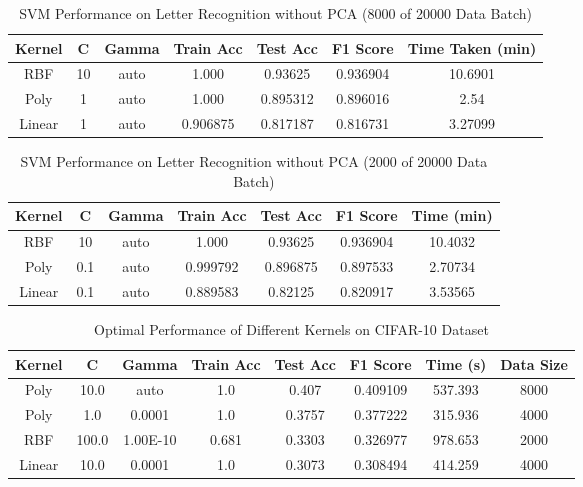 \documentclass[conference]{IEEEtran}
\begin{document}
\begin{table}[H]
\centering
\caption{SVM Performance on Letter Recognition without PCA (8000 of 20000 Data Batch)}
\begin{tabular}{|c|c|c|c|c|c|c|}
\hline
Kernel & C & Gamma & Train Acc & Test Acc & F1 Score & Time Taken (min) \\ \hline
RBF & 10 & auto & 1.000 & 0.93625 & 0.936904 & 10.6901 \\ \hline
Poly & 1 & auto & 1.000 & 0.895312 & 0.896016 & 2.54 \\ \hline
Linear & 1 & auto & 0.906875	 & 0.817187 & 0.816731 & 3.27099 \\ \hline
\end{tabular}
\end{table}

\newpage

\begin{table}[H]
\centering
\caption{SVM Performance on Letter Recognition without PCA (2000 of 20000 Data Batch)}
\tiny
\begin{tabular}{|c|c|c|c|c|c|c|}
\hline
Kernel & C & Gamma & Train Acc & Test Acc & F1 Score & Time (min) \\ \hline
RBF & 10 & auto & 1.000 & 0.93625 & 0.936904 & 10.4032 \\ \hline
Poly & 0.1 & auto & 0.999792 & 0.896875 & 0.897533 & 2.70734 \\ \hline
Linear & 0.1 & auto & 0.889583 & 0.82125 & 0.820917 & 3.53565 \\ \hline

\end{tabular}
\end{table}



\begin{table}[H]
\tiny
\centering
\caption{Optimal Performance of Different Kernels on CIFAR-10 Dataset}
\begin{tabular}{|c|c|c|c|c|c|c|c|}

\hline
Kernel & C & Gamma & Train Acc & Test Acc & F1 Score & Time (s) & Data Size \\ \hline
Poly & 10.0 & auto & 1.0 & 0.407 & 0.409109 & 537.393 & 8000 \\ \hline
Poly & 1.0 & 0.0001 & 1.0 & 0.3757 & 0.377222 & 315.936 & 4000 \\ \hline
RBF & 100.0 & 1.00E-10 & 0.681 & 0.3303 & 0.326977 & 978.653 & 2000 \\ \hline
Linear & 10.0 & 0.0001 & 1.0 & 0.3073 & 0.308494 & 414.259 & 4000 \\ \hline
\end{tabular}
\end{table}	
\end{document}
